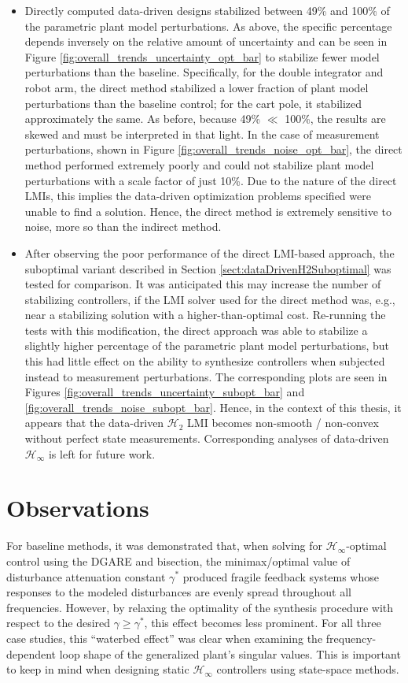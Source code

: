 \begin{itemize}
\item{Directly computed data-driven designs stabilized between 49\% and 100\% of the parametric plant model perturbations.  As above, the specific percentage depends inversely on the relative amount of uncertainty and can be seen in Figure \ref{fig:overall_trends_uncertainty_opt_bar} to stabilize fewer model perturbations than the baseline.  Specifically, for the double integrator and robot arm, the direct method stabilized a lower fraction of plant model perturbations than the baseline control; for the cart pole, it stabilized approximately the same.  As before, because 49\% $\ll$ 100\%, the results are skewed and must be interpreted in that light.  In the case of measurement perturbations, shown in Figure \ref{fig:overall_trends_noise_opt_bar}, the direct method performed extremely poorly and could not stabilize plant model perturbations with a scale factor of just 10\%.  Due to the nature of the direct LMIs, this implies the data-driven optimization problems specified were unable to find a solution.  Hence, the direct method is extremely sensitive to noise, more so than the indirect method.
}
%
\item{After observing the poor performance of the direct LMI-based approach, the suboptimal variant described in Section \ref{sect:dataDrivenH2Suboptimal} was tested for comparison.  It was anticipated this may increase the number of stabilizing controllers, if the LMI solver used for the direct method was, e.g., near a stabilizing solution with a higher-than-optimal cost.  Re-running the tests with this modification, the direct approach was able to stabilize a slightly higher percentage of the parametric plant model perturbations, but this had little effect on the ability to synthesize controllers when subjected instead to measurement perturbations.  The corresponding plots are seen in Figures \ref{fig:overall_trends_uncertainty_subopt_bar} and \ref{fig:overall_trends_noise_subopt_bar}.  Hence, in the context of this thesis, it appears that the data-driven $\mathcal{H}_{2}$ LMI becomes non-smooth / non-convex without perfect state measurements.  Corresponding analyses of data-driven $\mathcal{H}_{\infty}$ is left for future work.}
\end{itemize}

\section{Observations}
For baseline methods, it was demonstrated that, when solving for $\mathcal{H}_{\infty}$-optimal control using the DGARE and bisection, the minimax/optimal value of disturbance attenuation constant $\gamma^{*}$ produced fragile feedback systems whose responses to the modeled disturbances are evenly spread throughout all frequencies.  However, by relaxing the optimality of the synthesis procedure with respect to the desired $\gamma \geq \gamma^{*}$, this effect becomes less prominent.  For all three case studies, this ``waterbed effect'' was clear when examining the frequency-dependent loop shape of the generalized plant's singular values.  This is important to keep in mind when designing static $\mathcal{H}_{\infty}$ controllers using state-space methods.

